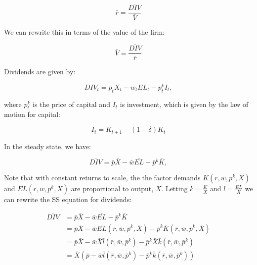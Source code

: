 \documentclass[letterpaper,12pt]{article}
\theoremstyle{definition}
\begin{document}
\begin{spacing}{1.5}
\begin{equation}
\label{eqn:equity_return}
\bar{r} = \frac{\overline{DIV}}{\bar{V}}
\end{equation} 

We can rewrite this in terms of the value of the firm:

\begin{equation}
\label{eqn:firm_val_ss}
\bar{V} = \frac{\overline{DIV}}{\bar{r}}
\end{equation} 


Dividends are given by:

\begin{equation}
DIV_{t} = p_{t}X_{t} - w_{t}EL_{t} - p^{k}_{t}I_{t},
\end{equation}

\noindent\noindent where $p^{k}_{t}$ is the price of capital and $I_{t}$ is investment, which is given by the law of motion for capital:

\begin{equation}
I_{t} = K_{t+1}-(1-\delta)K_{t}
\end{equation}

In the steady state, we have:

\begin{equation}
\label{eqn:ssDIV}
\overline{DIV} = \bar{p}\bar{X} - \bar{w}\bar{EL} - \bar{p}^{k}\bar{K},
\end{equation}

\noindent\noindent Note that with constant returns to scale, the the factor demands $K(r,w,p^{k},X)$ and $EL(r,w,p^{k},X)$ are proportional to output, $X$.  Letting $k=\frac{K}{X}$ and $l=\frac{EL}{X}$ we can rewrite the SS equation for dividends:

\begin{equation}
\begin{split}
\label{eqn:ssDIV_decomposed}
\overline{DIV} & = \bar{p}\bar{X} - \bar{w}\bar{EL} - \bar{p}^{k}\bar{K} \\
&  = \bar{p}\bar{X} - \bar{w}\bar{EL}(\bar{r},\bar{w},\bar{p}^{k},\bar{X}) - \bar{p}^{k}\bar{K}(\bar{r},\bar{w},\bar{p}^{k},\bar{X}) \\
& = \bar{p}\bar{X} - \bar{w}\bar{X}\bar{l}(\bar{r},\bar{w},\bar{p}^{k}) - \bar{p}^{k}\bar{X}\bar{k}(\bar{r},\bar{w},\bar{p}^{k}) \\
& = \bar{X}\left(\bar{p} - \bar{w}\bar{l}(\bar{r},\bar{w},\bar{p}^{k}) - \bar{p}^{k}\bar{k}(\bar{r},\bar{w},\bar{p}^{k})\right) \\
\end{split}
\end{equation}


\end{spacing}
\end{document}
